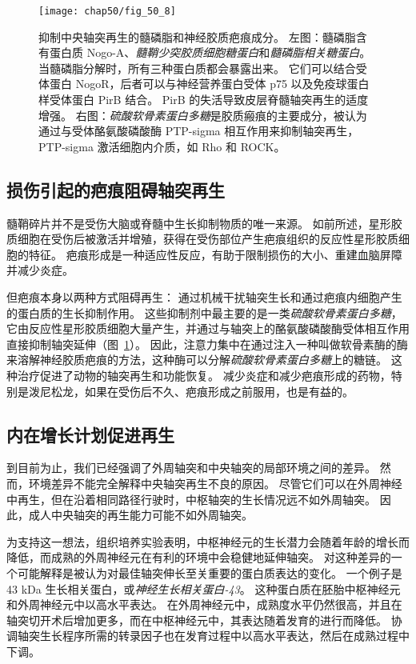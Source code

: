 \begin{figure}[htbp]
	\centering
	\texttt{[image: chap50/fig\_50\_8]}
	\caption{抑制中央轴突再生的髓磷脂和神经胶质疤痕成分\cite{yiu2006glial}。
		左图：髓磷脂含有蛋白质 Nogo-A、\textit{髓鞘少突胶质细胞糖蛋白}和\textit{髓磷脂相关糖蛋白}。
		当髓磷脂分解时，所有三种蛋白质都会暴露出来。
		它们可以结合受体蛋白 NogoR，后者可以与神经营养蛋白受体 p75 以及免疫球蛋白样受体蛋白 PirB 结合。
		PirB 的失活导致皮层脊髓轴突再生的适度增强。
		右图：\textit{硫酸软骨素蛋白多糖}是胶质瘢痕的主要成分，被认为通过与受体酪氨酸磷酸酶 PTP-sigma 相互作用来抑制轴突再生，PTP-sigma 激活细胞内介质，如 Rho 和 ROCK。}
	\label{fig:50_8}
\end{figure}



\subsection{损伤引起的疤痕阻碍轴突再生}

髓鞘碎片并不是受伤大脑或脊髓中生长抑制物质的唯一来源。
如前所述，星形胶质细胞在受伤后被激活并增殖，获得在受伤部位产生疤痕组织的反应性星形胶质细胞的特征。
疤痕形成是一种适应性反应，有助于限制损伤的大小、重建血脑屏障并减少炎症。


但疤痕本身以两种方式阻碍再生：
通过机械干扰轴突生长和通过疤痕内细胞产生的蛋白质的生长抑制作用。
这些抑制剂中最主要的是一类\textit{硫酸软骨素蛋白多糖}，它由反应性星形胶质细胞大量产生，并通过与轴突上的酪氨酸磷酸酶受体相互作用直接抑制轴突延伸（图~\ref{fig:50_8}）。
因此，注意力集中在通过注入一种叫做软骨素酶的酶来溶解神经胶质疤痕的方法，这种酶可以分解\textit{硫酸软骨素蛋白多糖}上的糖链。
这种治疗促进了动物的轴突再生和功能恢复。
减少炎症和减少疤痕形成的药物，特别是泼尼松龙，如果在受伤后不久、疤痕形成之前服用，也是有益的。



\subsection{内在增长计划促进再生}

到目前为止，我们已经强调了外周轴突和中央轴突的局部环境之间的差异。
然而，环境差异不能完全解释中央轴突再生不良的原因。
尽管它们可以在外周神经中再生，但在沿着相同路径行驶时，中枢轴突的生长情况远不如外周轴突。
因此，成人中央轴突的再生能力可能不如外周轴突。


为支持这一想法，组织培养实验表明，中枢神经元的生长潜力会随着年龄的增长而降低，而成熟的外周神经元在有利的环境中会稳健地延伸轴突。
对这种差异的一个可能解释是被认为对最佳轴突伸长至关重要的蛋白质表达的变化。
一个例子是 43 kDa 生长相关蛋白，或\textit{神经生长相关蛋白-43}。
这种蛋白质在胚胎中枢神经元和外周神经元中以高水平表达。
在外周神经元中，成熟度水平仍然很高，并且在轴突切开术后增加更多，而在中枢神经元中，其表达随着发育的进行而降低。
协调轴突生长程序所需的转录因子也在发育过程中以高水平表达，然后在成熟过程中下调。


